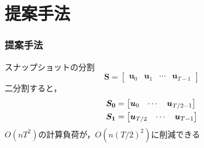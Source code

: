 \documentclass[aspectratio=169,dvipdfmx,hyperref={bookmarks=true}]{beamer}
\begin{document}
\section{提案手法}
\begin{frame}
\frametitle{提案手法}
\begin{block}{スナップショットの分割}
 \[ \bm{S} = 
        		\begin{bmatrix}
   \bm{u}_0 & \bm{u}_1 &\cdots  & \bm{u}_{T-1}
\end{bmatrix}
\]
二分割すると，
\begin{eqnarray}
	\bm{S_0} 		&= \begin{bmatrix}\bm{u}_0 &\cdots  & \bm{u}_{T/2-1}\end{bmatrix}\notag		\\
	\bm{S_1} 	&= \begin{bmatrix} \bm{u}_{T/2}  &\cdots  & \bm{u}_{T-1}\end{bmatrix}\notag	
\end{eqnarray}
$O(nT^2)$の計算負荷が，$O(n(T/2)^2)$に削減できる
\end{block}
 \end{frame}

  
\end{document}
